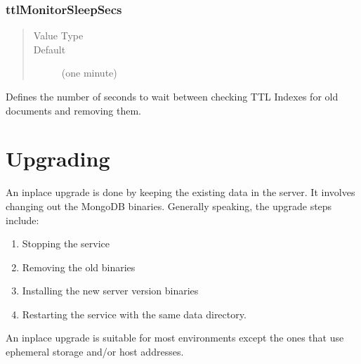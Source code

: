 \documentclass[letterpaper,10pt,english]{sphinxmanual}
\begin{document}
\subsection{ttlMonitorSleepSecs}
\label{\detokenize{set-parameter:ttlmonitorsleepsecs}}\begin{quote}\begin{description}
\item[{Value Type}] \leavevmode
\sphinxAtStartPar
{}

\item[{Default}] \leavevmode
\sphinxAtStartPar
{} (one minute)

\end{description}\end{quote}

\sphinxAtStartPar
Defines the number of seconds to wait
between checking TTL Indexes for old documents and removing them.


\chapter{Upgrading }
\label{\detokenize{install/upgrade-from-mongodb:upgrading-psmdb}}\label{\detokenize{install/upgrade-from-mongodb:upgrade-psmdb}}\label{\detokenize{install/upgrade-from-mongodb::doc}}
\sphinxAtStartPar
An in\sphinxhyphen{}place upgrade is done by keeping the existing data in the server. It involves changing out the MongoDB binaries. Generally speaking, the upgrade steps include:
\begin{enumerate}
%
\item {} 
\sphinxAtStartPar
Stopping the  service

\item {} 
\sphinxAtStartPar
Removing the old binaries

\item {} 
\sphinxAtStartPar
Installing the new server version binaries

\item {} 
\sphinxAtStartPar
Restarting the  service with the same  data directory.

\end{enumerate}

\sphinxAtStartPar
An in\sphinxhyphen{}place upgrade is suitable for most environments except the ones that use ephemeral storage and/or host addresses.
\end{document}
